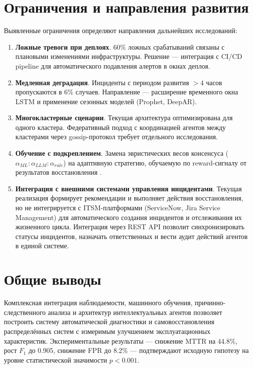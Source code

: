 \section*{Ограничения и направления развития}

Выявленные ограничения определяют направления дальнейших исследований:

\begin{enumerate}
    \item \textbf{Ложные тревоги при деплоях}. 60\% ложных срабатываний связаны с плановыми изменениями инфраструктуры. Решение --- интеграция с CI/CD pipeline для автоматического подавления алертов в окнах деплоя.

    \item \textbf{Медленная деградация}. Инциденты с периодом развития $> 4$ часов пропускаются в 6\% случаев. Направление --- расширение временного окна LSTM и применение сезонных моделей (Prophet, DeepAR).

    \item \textbf{Многокластерные сценарии}. Текущая архитектура оптимизирована для одного кластера. Федеративный подход с координацией агентов между кластерами через gossip-протокол требует отдельного исследования.

    \item \textbf{Обучение с подкреплением}. Замена эвристических весов консенсуса ($\alpha_{ML}:\alpha_{LLM}:\alpha_{rule}$) на адаптивную стратегию, обучаемую по reward-сигналу от результатов восстановления \cite{goodfellow_deep_learning,murphy_machine_learning}.

    \item \textbf{Интеграция с внешними системами управления инцидентами}. Текущая реализация формирует рекомендации и выполняет действия восстановления, но не интегрируется с ITSM-платформами (ServiceNow, Jira Service Management) для автоматического создания инцидентов и отслеживания их жизненного цикла. Интеграция через REST API позволит синхронизировать статусы инцидентов, назначать ответственных и вести аудит действий агентов в единой системе.
\end{enumerate}

\section*{Общие выводы}

Комплексная интеграция наблюдаемости, машинного обучения, причинно-следственного анализа и архитектур интеллектуальных агентов позволяет построить систему автоматической диагностики и самовосстановления распределённых систем с измеримым улучшением эксплуатационных характеристик. Экспериментальные результаты --- снижение MTTR на 44.8\%, рост $F_1$ до 0.905, снижение FPR до 8.2\% --- подтверждают исходную гипотезу на уровне статистической значимости $p < 0.001$.

